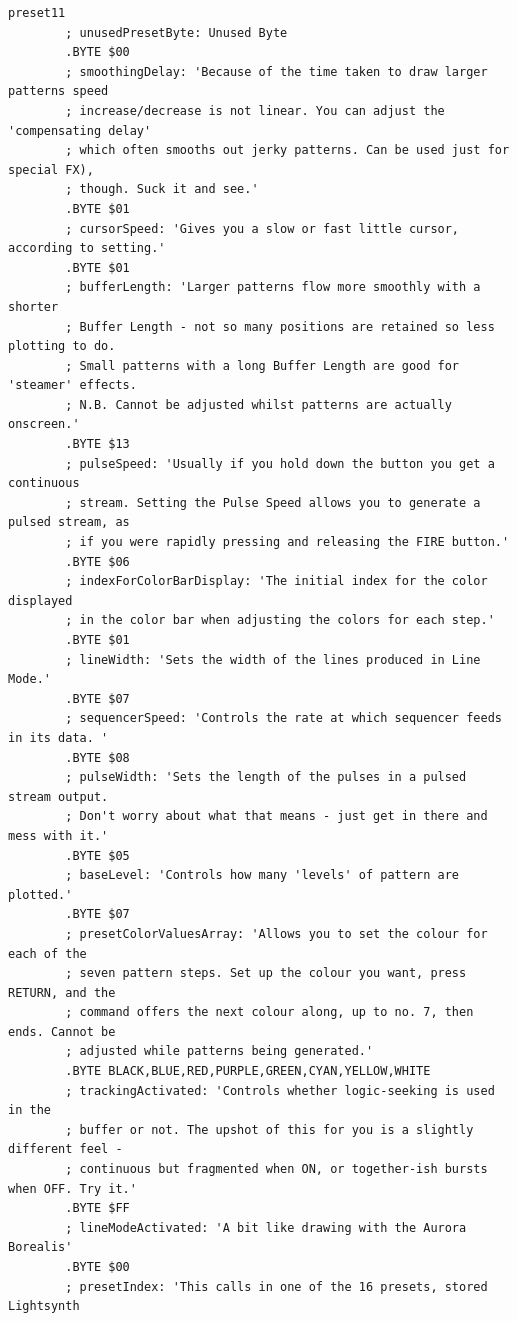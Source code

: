 \begin{lstlisting}[basicstyle=\tiny,caption=Source code for Preset 11.]
preset11
        ; unusedPresetByte: Unused Byte
        .BYTE $00
        ; smoothingDelay: 'Because of the time taken to draw larger patterns speed
        ; increase/decrease is not linear. You can adjust the 'compensating delay'
        ; which often smooths out jerky patterns. Can be used just for special FX),
        ; though. Suck it and see.'
        .BYTE $01
        ; cursorSpeed: 'Gives you a slow or fast little cursor, according to setting.'
        .BYTE $01
        ; bufferLength: 'Larger patterns flow more smoothly with a shorter
        ; Buffer Length - not so many positions are retained so less plotting to do.
        ; Small patterns with a long Buffer Length are good for 'steamer' effects.
        ; N.B. Cannot be adjusted whilst patterns are actually onscreen.'
        .BYTE $13
        ; pulseSpeed: 'Usually if you hold down the button you get a continuous
        ; stream. Setting the Pulse Speed allows you to generate a pulsed stream, as
        ; if you were rapidly pressing and releasing the FIRE button.'
        .BYTE $06
        ; indexForColorBarDisplay: 'The initial index for the color displayed
        ; in the color bar when adjusting the colors for each step.'
        .BYTE $01
        ; lineWidth: 'Sets the width of the lines produced in Line Mode.'
        .BYTE $07
        ; sequencerSpeed: 'Controls the rate at which sequencer feeds in its data. '
        .BYTE $08
        ; pulseWidth: 'Sets the length of the pulses in a pulsed stream output.
        ; Don't worry about what that means - just get in there and mess with it.'
        .BYTE $05
        ; baseLevel: 'Controls how many 'levels' of pattern are plotted.'
        .BYTE $07
        ; presetColorValuesArray: 'Allows you to set the colour for each of the
        ; seven pattern steps. Set up the colour you want, press RETURN, and the
        ; command offers the next colour along, up to no. 7, then ends. Cannot be
        ; adjusted while patterns being generated.'
        .BYTE BLACK,BLUE,RED,PURPLE,GREEN,CYAN,YELLOW,WHITE
        ; trackingActivated: 'Controls whether logic-seeking is used in the
        ; buffer or not. The upshot of this for you is a slightly different feel -
        ; continuous but fragmented when ON, or together-ish bursts when OFF. Try it.'
        .BYTE $FF
        ; lineModeActivated: 'A bit like drawing with the Aurora Borealis'
        .BYTE $00
        ; presetIndex: 'This calls in one of the 16 presets, stored Lightsynth

\end{lstlisting}
